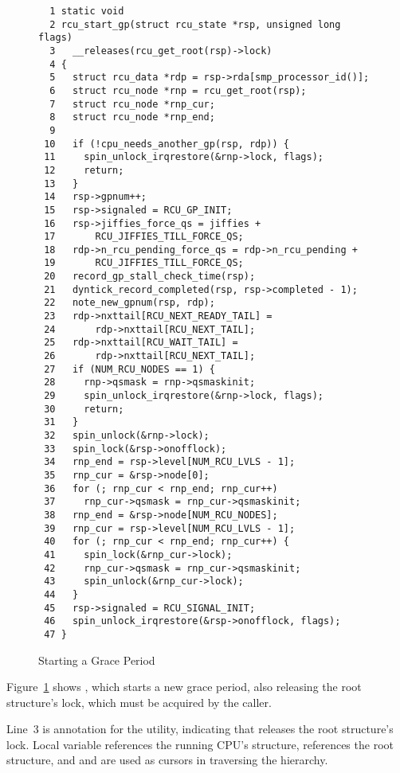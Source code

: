 \begin{figure}[tbp]
{ \scriptsize
\begin{verbatim}
  1 static void
  2 rcu_start_gp(struct rcu_state *rsp, unsigned long flags)
  3   __releases(rcu_get_root(rsp)->lock)
  4 {
  5   struct rcu_data *rdp = rsp->rda[smp_processor_id()];
  6   struct rcu_node *rnp = rcu_get_root(rsp);
  7   struct rcu_node *rnp_cur;
  8   struct rcu_node *rnp_end;
  9
 10   if (!cpu_needs_another_gp(rsp, rdp)) {
 11     spin_unlock_irqrestore(&rnp->lock, flags);
 12     return;
 13   }
 14   rsp->gpnum++;
 15   rsp->signaled = RCU_GP_INIT;
 16   rsp->jiffies_force_qs = jiffies +
 17       RCU_JIFFIES_TILL_FORCE_QS;
 18   rdp->n_rcu_pending_force_qs = rdp->n_rcu_pending +
 19       RCU_JIFFIES_TILL_FORCE_QS;
 20   record_gp_stall_check_time(rsp);
 21   dyntick_record_completed(rsp, rsp->completed - 1);
 22   note_new_gpnum(rsp, rdp);
 23   rdp->nxttail[RCU_NEXT_READY_TAIL] =
 24       rdp->nxttail[RCU_NEXT_TAIL];
 25   rdp->nxttail[RCU_WAIT_TAIL] =
 26       rdp->nxttail[RCU_NEXT_TAIL];
 27   if (NUM_RCU_NODES == 1) {
 28     rnp->qsmask = rnp->qsmaskinit;
 29     spin_unlock_irqrestore(&rnp->lock, flags);
 30     return;
 31   }
 32   spin_unlock(&rnp->lock);
 33   spin_lock(&rsp->onofflock);
 34   rnp_end = rsp->level[NUM_RCU_LVLS - 1];
 35   rnp_cur = &rsp->node[0];
 36   for (; rnp_cur < rnp_end; rnp_cur++)
 37     rnp_cur->qsmask = rnp_cur->qsmaskinit;
 38   rnp_end = &rsp->node[NUM_RCU_NODES];
 39   rnp_cur = rsp->level[NUM_RCU_LVLS - 1];
 40   for (; rnp_cur < rnp_end; rnp_cur++) {
 41     spin_lock(&rnp_cur->lock);
 42     rnp_cur->qsmask = rnp_cur->qsmaskinit;
 43     spin_unlock(&rnp_cur->lock);
 44   }
 45   rsp->signaled = RCU_SIGNAL_INIT;
 46   spin_unlock_irqrestore(&rsp->onofflock, flags);
 47 }
\end{verbatim}
}
\caption{Starting a Grace Period}
\label{fig:app:rcuimpl:rcutreewt:Starting a Grace Period}
\end{figure}

Figure~\ref{fig:app:rcuimpl:rcutreewt:Starting a Grace Period}
shows , which starts a new grace period,
also releasing the root  structure's lock, which
must be acquired by the caller.

Line~3 is annotation for the  utility, indicating
that  releases the root 
structure's lock.
Local variable  references the running CPU's 
structure,  references the root  structure,
and  and  are used as cursors in traversing
the  hierarchy.


